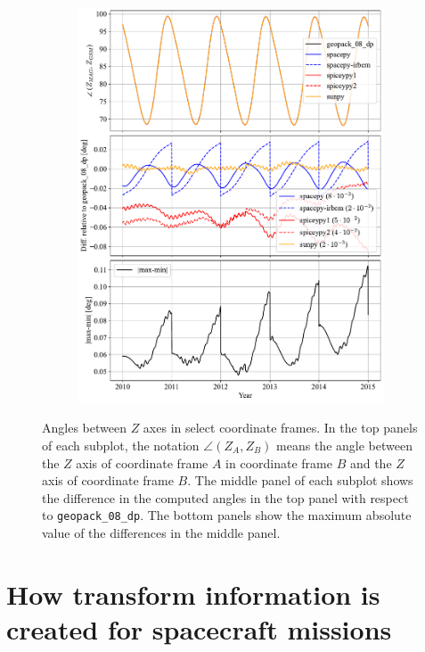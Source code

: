 \documentclass[draft]{agujournal2019}
\begin{document}
\begin{figure}[htb]
\begin{subfigure}[b]{0.49\textwidth}
         \includegraphics[width=\textwidth]{code/figures/angles/delta=1days_20100101-20150101/MAG_GSM.pdf}
     \end{subfigure}
     \caption{Angles between $Z$ axes in select coordinate frames. In the top panels of each subplot, the notation $\angle (Z_A, Z_B)$ means the angle between the $Z$ axis of coordinate frame $A$ in coordinate frame $B$ and the $Z$ axis of coordinate frame $B$. The middle panel of each subplot shows the difference in the computed angles in the top panel with respect to \texttt{geopack\_08\_dp}. The bottom panels show the maximum absolute value of the differences in the middle panel.}
     \label{fig:angles}
\end{figure}

\clearpage

\section{How transform information is created for spacecraft missions}
\label{sect:missions}
\end{document}
